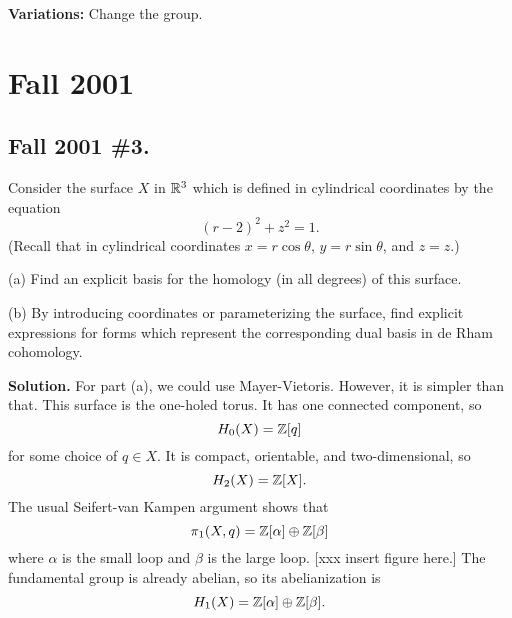 \documentclass[10pt]{article}
\numberwithin{equation}{subsection}
\begin{document}
\textbf{Variations:}  Change the group.

\newpage
\section{Fall 2001}

\subsection{Fall 2001 \#3.}
\label{sec:F01.3}

Consider the surface $X$ in $\mathbb{R}^3$ which is defined in cylindrical coordinates
by the equation
$$
	(r-2)^2 + z^2 = 1.
$$
(Recall that in cylindrical coordinates $x=r\cos\theta$, $y=r\sin\theta$, and
$z=z$.)

(a) Find an explicit basis for the homology (in all degrees) of this surface.

(b) By introducing coordinates or parameterizing the surface, find explicit
expressions for forms which represent the corresponding dual basis in de Rham
cohomology.

\textbf{Solution.} For part (a), we could use Mayer-Vietoris.  However, it is
simpler than that.  This surface is the one-holed torus.  It has one connected
component, so
$$
	H_0(X)= \mathbb{Z}[q]
$$
for some choice of $q \in X$.  It is compact, orientable, and two-dimensional,
so
$$
	H_2(X)=\mathbb{Z}[X].
$$
The usual Seifert-van Kampen argument shows that
$$
	\pi_1(X,q) = \mathbb{Z}[\alpha]\oplus\mathbb{Z}[\beta]
$$
where $\alpha$ is the small loop and $\beta$ is the large loop.  [xxx insert
figure here.]  The fundamental group is already abelian, so its abelianization
is
$$
	H_1(X)=\mathbb{Z}[\alpha]\oplus\mathbb{Z}[\beta].
$$
\end{document}

